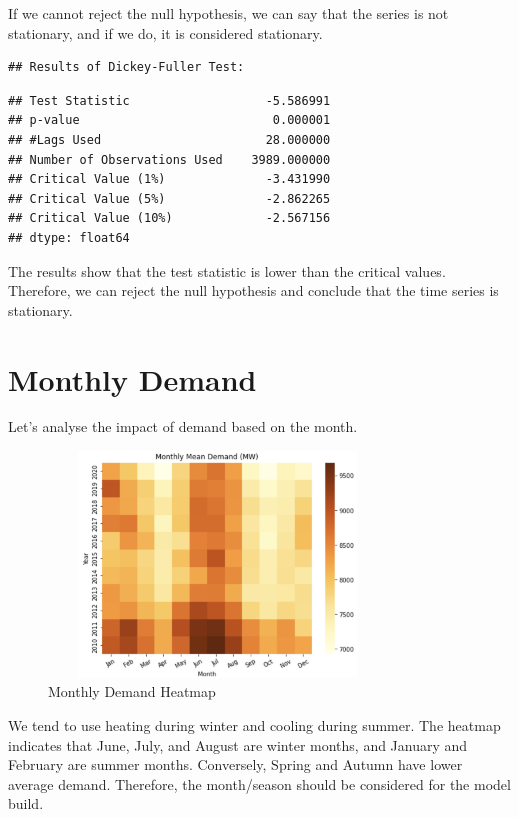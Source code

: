 \documentclass[mstat,12pt]{unswthesis}
\begin{document}
If we cannot reject the null hypothesis, we can say that the series is
not stationary, and if we do, it is considered stationary.

\begin{verbatim}
## Results of Dickey-Fuller Test:
\end{verbatim}

\begin{verbatim}
## Test Statistic                   -5.586991
## p-value                           0.000001
## #Lags Used                       28.000000
## Number of Observations Used    3989.000000
## Critical Value (1%)              -3.431990
## Critical Value (5%)              -2.862265
## Critical Value (10%)             -2.567156
## dtype: float64
\end{verbatim}

The results show that the test statistic is lower than the critical
values. Therefore, we can reject the null hypothesis and conclude that
the time series is stationary.

\hypertarget{monthly-demand}{%
\section{Monthly Demand}\label{monthly-demand}}

Let's analyse the impact of demand based on the month.

\begin{figure}[H]
\centering
\includegraphics[width=0.80\textwidth,height=6cm]{monthly_heat.png}
\caption{Monthly Demand Heatmap}
\label{monthly_heat.png}
\end{figure}

We tend to use heating during winter and cooling during summer. The
heatmap indicates that June, July, and August are winter months, and
January and February are summer months. Conversely, Spring and Autumn
have lower average demand. Therefore, the month/season should be
considered for the model build.
\end{document}
